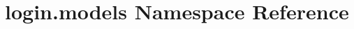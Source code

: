 \hypertarget{namespacelogin_1_1models}{\section{login.\-models Namespace Reference}
\label{namespacelogin_1_1models}
}
